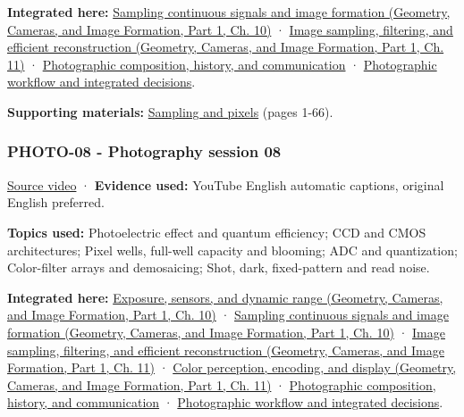 \textbf{Integrated here:} \href{../03-Geometry-Cameras-and-Image-Formation-P01/main.pdf\#03-visual-computing-i-ch003-sampling-continuous-signals-and-image-formation}{Sampling continuous signals and image formation (Geometry, Cameras, and Image Formation, Part 1, Ch. 10)} · \href{../03-Geometry-Cameras-and-Image-Formation-P01/main.pdf\#03-visual-computing-i-ch004-image-sampling-filtering-and-efficient-reconstruction}{Image sampling, filtering, and efficient reconstruction (Geometry, Cameras, and Image Formation, Part 1, Ch. 11)} · \hyperref[04-visual-computing-ii-ch034-photographic-composition-history-and-communication]{Photographic composition, history, and communication} · \hyperref[04-visual-computing-ii-ch034-photographic-workflow-and-integrated-decisions]{Photographic workflow and integrated decisions}.

\textbf{Supporting materials:} \href{https://drive.google.com/open?id=0B6w2XfPHEcZYc1lhZjNHU1NNVDQ}{Sampling and pixels} (pages 1-66).

\subsubsection{PHOTO-08 - Photography session 08}\label{04-visual-computing-ii-ch036-photo-08---photography-session-08}

\hypertarget{04-visual-computing-ii-ch036-photo-08---photography-session-08}{}

\href{https://www.youtube.com/watch?v=VSdUlxgpKn4}{Source video} · \textbf{Evidence used:} YouTube English automatic captions, original English preferred.

\textbf{Topics used:} Photoelectric effect and quantum efficiency; CCD and CMOS architectures; Pixel wells, full-well capacity and blooming; ADC and quantization; Color-filter arrays and demosaicing; Shot, dark, fixed-pattern and read noise.

\textbf{Integrated here:} \href{../03-Geometry-Cameras-and-Image-Formation-P01/main.pdf\#03-visual-computing-i-ch003-exposure-sensors-and-dynamic-range}{Exposure, sensors, and dynamic range (Geometry, Cameras, and Image Formation, Part 1, Ch. 10)} · \href{../03-Geometry-Cameras-and-Image-Formation-P01/main.pdf\#03-visual-computing-i-ch003-sampling-continuous-signals-and-image-formation}{Sampling continuous signals and image formation (Geometry, Cameras, and Image Formation, Part 1, Ch. 10)} · \href{../03-Geometry-Cameras-and-Image-Formation-P01/main.pdf\#03-visual-computing-i-ch004-image-sampling-filtering-and-efficient-reconstruction}{Image sampling, filtering, and efficient reconstruction (Geometry, Cameras, and Image Formation, Part 1, Ch. 11)} · \href{../03-Geometry-Cameras-and-Image-Formation-P01/main.pdf\#03-visual-computing-i-ch004-color-perception-encoding-and-display}{Color perception, encoding, and display (Geometry, Cameras, and Image Formation, Part 1, Ch. 11)} · \hyperref[04-visual-computing-ii-ch034-photographic-composition-history-and-communication]{Photographic composition, history, and communication} · \hyperref[04-visual-computing-ii-ch034-photographic-workflow-and-integrated-decisions]{Photographic workflow and integrated decisions}.

